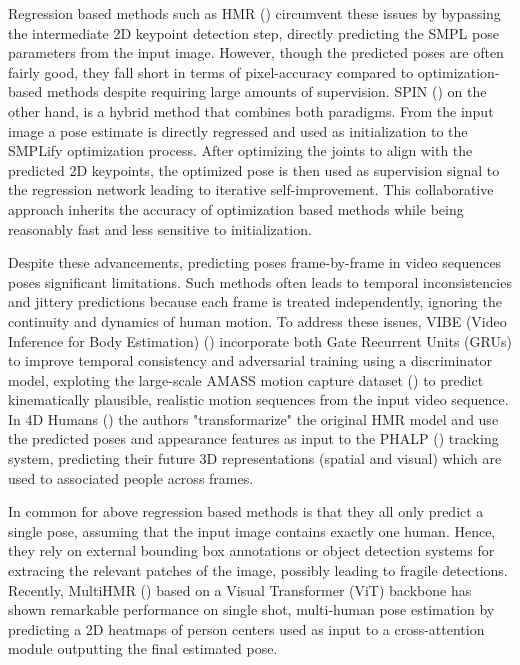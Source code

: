Regression based methods such as HMR (\cite{hmrKanazawa17}) circumvent these issues by bypassing the intermediate 2D keypoint detection step, directly predicting the SMPL pose parameters from the input image. However, though the predicted poses are often fairly good, they fall short in terms of pixel-accuracy compared to optimization-based methods despite requiring large amounts of supervision. SPIN (\cite{kolotouros2019spin}) on the other hand, is a hybrid method that combines both paradigms. From the input image a pose estimate is directly regressed and used as initialization to the SMPLify optimization process. After optimizing the joints to align with the predicted 2D keypoints, the optimized pose is then used as supervision signal to the regression network leading to iterative self-improvement. This collaborative approach inherits the accuracy of optimization based methods while being reasonably fast and less sensitive to initialization.

Despite these advancements, predicting poses frame-by-frame in video sequences poses significant limitations. Such methods often leads to temporal inconsistencies and jittery predictions because each frame is treated independently, ignoring the continuity and dynamics of human motion. To address these issues, VIBE (Video Inference for Body Estimation) (\cite{kocabas2019vibe}) incorporate both Gate Recurrent Units (GRUs) to improve temporal consistency and adversarial training using a discriminator model, exploting the large-scale AMASS motion capture dataset (\cite{AMASS:ICCV:2019}) to predict kinematically plausible, realistic motion sequences from the input video sequence. In 4D Humans (\cite{goel2023humans}) the authors "transformarize" the original HMR model and use the predicted poses and appearance features as input to the PHALP (\cite{rajasegaran2022tracking}) tracking system, predicting their future 3D representations (spatial and visual) which are used to associated people across frames.

In common for above regression based methods is that they all only predict a single pose, assuming that the input image contains exactly one human. Hence, they rely on external bounding box annotations or object detection systems for extracing the relevant patches of the image, possibly leading to fragile detections. Recently, MultiHMR (\cite{multi-hmr2024}) based on a Visual Transformer (ViT) backbone has shown remarkable performance on single shot, multi-human pose estimation by predicting a 2D heatmaps of person centers used as input to a cross-attention module outputting the final estimated pose. 

